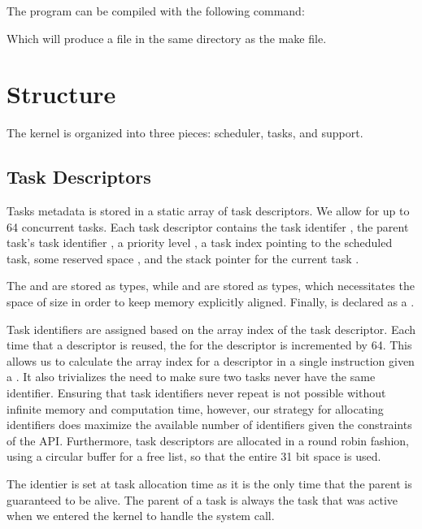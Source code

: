 \documentclass[pdftex,10pt,a4paper]{article}
\begin{document}
The program can be compiled with the following command:

\begin{center}
\end{center}

Which will produce a  file in the same directory as
the make file.

\section*{Structure}

The kernel is organized into three pieces: scheduler, tasks, and
support.

\subsection*{Task Descriptors}

Tasks metadata is stored in a static array of task descriptors. We
allow for up to 64 concurrent tasks. Each task descriptor contains the
task identifer , the parent task's task identifier
, a priority level , a task index pointing
to the  scheduled task, some reserved space ,
and the stack pointer for the current task .

The  and  are stored as  types, while 
and  are stored as  types, which
necessitates the  space of size  in order to keep memory explicitly aligned. Finally, 
is declared as a .

Task identifiers are assigned based on the array index of the task
descriptor. Each time that a descriptor is reused, the  for
the descriptor is incremented by 64. This allows us to calculate the
array index for a descriptor in a single instruction given a
. It also trivializes the need to make sure two tasks never
have the same identifier. Ensuring that task identifiers never repeat
is not possible without infinite memory and computation time, however,
our strategy for allocating identifiers does maximize the available
number of identifiers given the constraints of the API. Furthermore,
task descriptors are allocated in a round robin fashion, using a
circular buffer for a free list, so that the entire 31 bit space is used.

The  identier is set at task allocation time as it is the
only time that the parent is guaranteed to be alive. The parent of a
task is always the task that was active when we entered the kernel to
handle the system call.
\end{document}
